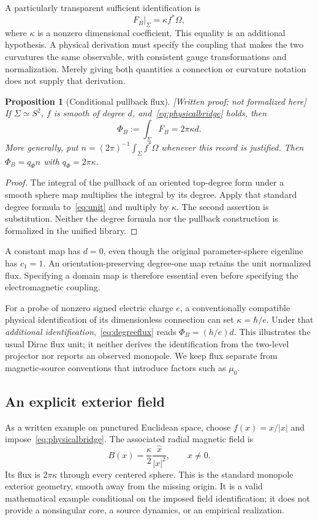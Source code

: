 \documentclass[11pt]{article}
\newtheorem{proposition}[theorem]{Proposition}
\theoremstyle{definition}\newtheorem{definition}[theorem]{Definition}
\theoremstyle{remark}\newtheorem{remark}[theorem]{Remark}
\newcommand{\written}{\textnormal{\small[Written proof; not formalized here]}\ }
\begin{document}
A particularly transparent sufficient identification is
\begin{equation}\label{eq:physicalbridge}
 F_B\big|_\Sigma=\kappa f^*\Omega,
\end{equation}
where $\kappa$ is a nonzero dimensional coefficient. This equality is an additional hypothesis. A physical derivation must specify the coupling that makes the two curvatures the same observable, with consistent gauge transformations and normalization. Merely giving both quantities a connection or curvature notation does not supply that derivation.

\begin{proposition}[Conditional pullback flux]\label{prop:pullback}\written
If $\Sigma\simeq S^2$, $f$ is smooth of degree $d$, and~\eqref{eq:physicalbridge} holds, then
\begin{equation}\label{eq:degreeflux}
 \Phi_B:=\int_\Sigma F_B=2\pi\kappa d.
\end{equation}
More generally, put $n=(2\pi)^{-1}\int_\Sigma f^*\Omega$ whenever this record is justified. Then $\Phi_B=q_\Phi n$ with $q_\Phi=2\pi\kappa$.
\end{proposition}
\begin{proof}
The integral of the pullback of an oriented top-degree form under a smooth sphere map multiplies the integral by its degree. Apply that standard degree formula to~\eqref{eq:unit} and multiply by $\kappa$. The second assertion is substitution. Neither the degree formula nor the pullback construction is formalized in the unified library.
\end{proof}
A constant map has $d=0$, even though the original parameter-sphere eigenline has $c_1=1$. An orientation-preserving degree-one map retains the unit normalized flux. Specifying a domain map is therefore essential even before specifying the electromagnetic coupling.

For a probe of nonzero signed electric charge $e$, a conventionally compatible physical identification of its dimensionless connection can set $\kappa=\hbar/e$. Under that \emph{additional identification},~\eqref{eq:degreeflux} reads $\Phi_B=(h/e)d$. This illustrates the usual Dirac flux unit; it neither derives the identification from the two-level projector nor reports an observed monopole. We keep flux separate from magnetic-source conventions that introduce factors such as $\mu_0$.

\subsection{An explicit exterior field}
As a written example on punctured Euclidean space, choose $f(x)=x/|x|$ and impose~\eqref{eq:physicalbridge}. The associated radial magnetic field is
\begin{equation}\label{eq:radial}
 B(x)=\frac{\kappa}{2}\frac{\widehat x}{|x|^2},\qquad x\neq0.
\end{equation}
Its flux is $2\pi\kappa$ through every centered sphere. This is the standard monopole exterior geometry, smooth away from the missing origin. It is a valid mathematical example conditional on the imposed field identification; it does not provide a nonsingular core, a source dynamics, or an empirical realization.
\end{document}
